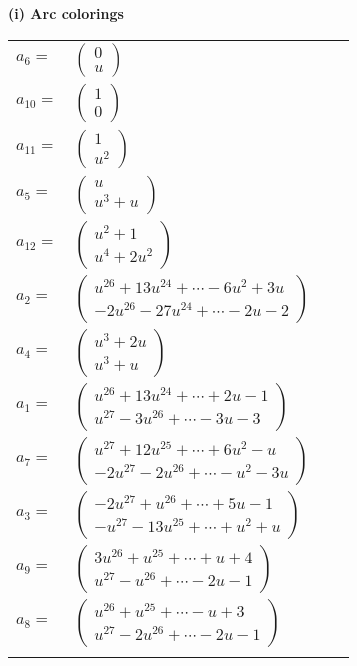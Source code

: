\documentclass[1p]{elsarticle_modified}
\theoremstyle{definition}
\begin{document}
\flushleft \textbf{(i) Arc colorings}\\
\begin{tabular}{m{7pt} m{180pt} m{7pt} m{180pt} }
\flushright $a_{6}=$&$\begin{pmatrix}0\\u\end{pmatrix}$ \\
\flushright $a_{10}=$&$\begin{pmatrix}1\\0\end{pmatrix}$ \\
\flushright $a_{11}=$&$\begin{pmatrix}1\\u^2\end{pmatrix}$ \\
\flushright $a_{5}=$&$\begin{pmatrix}u\\u^3+u\end{pmatrix}$ \\
\flushright $a_{12}=$&$\begin{pmatrix}u^2+1\\u^4+2 u^2\end{pmatrix}$ \\
\flushright $a_{2}=$&$\begin{pmatrix}u^{26}+13 u^{24}+\cdots-6 u^2+3 u\\-2 u^{26}-27 u^{24}+\cdots-2 u-2\end{pmatrix}$ \\
\flushright $a_{4}=$&$\begin{pmatrix}u^3+2 u\\u^3+u\end{pmatrix}$ \\
\flushright $a_{1}=$&$\begin{pmatrix}u^{26}+13 u^{24}+\cdots+2 u-1\\u^{27}-3 u^{26}+\cdots-3 u-3\end{pmatrix}$ \\
\flushright $a_{7}=$&$\begin{pmatrix}u^{27}+12 u^{25}+\cdots+6 u^2- u\\-2 u^{27}-2 u^{26}+\cdots- u^2-3 u\end{pmatrix}$ \\
\flushright $a_{3}=$&$\begin{pmatrix}-2 u^{27}+u^{26}+\cdots+5 u-1\\- u^{27}-13 u^{25}+\cdots+u^2+u\end{pmatrix}$ \\
\flushright $a_{9}=$&$\begin{pmatrix}3 u^{26}+u^{25}+\cdots+u+4\\u^{27}- u^{26}+\cdots-2 u-1\end{pmatrix}$ \\
\flushright $a_{8}=$&$\begin{pmatrix}u^{26}+u^{25}+\cdots- u+3\\u^{27}-2 u^{26}+\cdots-2 u-1\end{pmatrix}$\\&\end{tabular}
\end{document}
